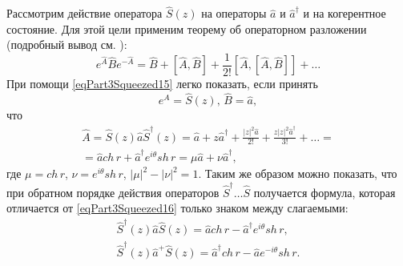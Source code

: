 Рассмотрим действие оператора $\hat{S}\left(z\right)$ на операторы
$\hat{a}$ и $\hat{a}^{\dag}$ и на когерентное состояние. Для этой цели
применим теорему об операторном разложении (подробный вывод
см. ):  
\begin{equation}
e^{\hat{A}}\hat{B}e^{-\hat{A}} = 
\hat{B} + \left[\hat{A},\hat{B}\right] + 
\frac{1}{2!} \left[\hat{A},\left[\hat{A},\hat{B}\right]\right] + \dots
\label{eqPart3Squeezed15}
\end{equation}
При помощи \eqref{eqPart3Squeezed15} легко показать, если принять
\[
e^{\hat{A}} = \hat{S}\left(z\right), \, \hat{B} = \hat{a},
\]
что
\begin{eqnarray}
\hat{A} = \hat{S}\left(z\right)\hat{a}\hat{S}^{\dag}\left(z\right) =
\hat{a} + z \hat{a}^{\dag} + \frac{\left|z\right|^2\hat{a}}{2!} +
\frac{z\left|z\right|^2\hat{a}^{\dag}}{3!} + \dots = 
\nonumber \\
=\hat{a} ch\,r + \hat{a}^{\dag} e^{i\theta} sh \, r = 
\mu \hat{a} + \nu \hat{a}^{\dag},
\label{eqPart3Squeezed16}
\end{eqnarray}
где $\mu = ch\,r$, $\nu = e^{i\theta} sh\,r$, $\left|\mu\right|^2 -
\left|\nu\right|^2  = 1$.
Таким же образом можно показать, что при обратном порядке действия
операторов $\hat{S}^{\dag}\dots\hat{S}$ получается формула, которая
отличается от \eqref{eqPart3Squeezed16} только знаком между
слагаемыми:
\begin{eqnarray}
\hat{S}^{\dag}\left(z\right)\hat{a}\hat{S}\left(z\right) 
=\hat{a} ch\,r - \hat{a}^{\dag} e^{i\theta} sh \, r,
\nonumber \\
\hat{S}^{\dag}\left(z\right)\hat{a}^{+}\hat{S}\left(z\right) 
=\hat{a}^{\dag} ch\,r - \hat{a} e^{-i\theta} sh \, r.
\label{eqPart3Squeezed16a}
\end{eqnarray}

